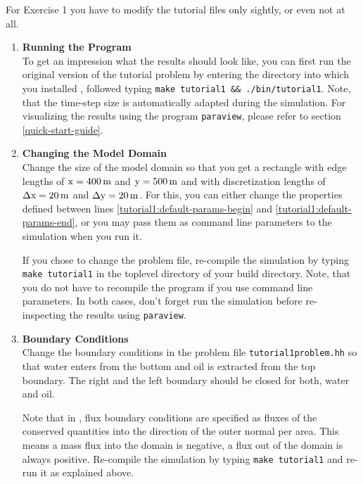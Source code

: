 \renewcommand{\labelenumi}{\alph{enumi})}

For Exercise 1 you have to modify the tutorial files only sightly, or
even not at all.

\begin{enumerate}

\item \textbf{Running the Program} \\
  To get an impression what the results should look like, you can
  first run the original version of the tutorial problem by entering
  the directory into which you installed \eWoms, followed typing
  \texttt{make tutorial1 \&\& ./bin/tutorial1}.  Note, that the
  time-step size is automatically adapted during the simulation.  For
  visualizing the results using the program \texttt{paraview}, please
  refer to section \ref{quick-start-guide}.

\item \textbf{Changing the Model Domain} \\
  Change the size of the model domain so that you get a rectangle with
  edge lengths of $\text{x} = \unit[400]{m}$ and $\text{y} =
  \unit[500]{m}$ and with discretization lengths of $\Delta \text{x} =
  \unit[20]{m}$ and $\Delta \text{y} = \unit[20]{m}$. For this, you can
  either change the properties defined between lines
  \ref{tutorial1:default-params-begin} and
  \ref{tutorial1:default-params-end}, or you may pass them as
  command line parameters to the simulation when you run it.

  If you chose to change the problem file, re-compile the simulation
  by typing \texttt{make tutorial1} in the toplevel directory of your
  \eWoms build directory.  Note, that you do not have to recompile the
  program if you use command line parameters. In both cases, don't
  forget run the simulation before re-inspecting the results using
  \texttt{paraview}.
  
\item \textbf{Boundary Conditions} \\
  Change the boundary conditions in the problem file
  \texttt{tutorial1problem.hh} so that water enters from the
  bottom and oil is extracted from the top boundary. The right and the
  left boundary should be closed for both, water and oil. 

  Note that in \eWoms, flux boundary conditions are specified as
  fluxes of the conserved quantities into the direction of the outer
  normal per area. This means a mass flux into the domain is negative,
  a flux out of the domain is always positive. Re-compile the
  simulation by typing \texttt{make tutorial1} and re-run it
  as explained above.


\end{enumerate}
